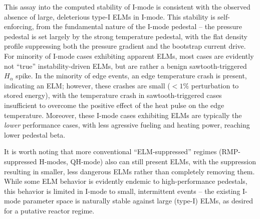 This assay into the computed stability of I-mode is consistent with the observed absence of large, deleterious type-I ELMs in I-mode.  This stability is self-enforcing, from the fundamental nature of the I-mode pedestal -- the pressure pedestal is set largely by the strong temperature pedestal, with the flat density profile suppressing both the pressure gradient and the bootstrap current drive.  For minority of I-mode cases exhibiting apparent ELMs, most cases are evidently not ``true'' instability-driven ELMs, but are rather a benign sawtooth-triggered $H_\alpha$ spike.  In the minority of edge events, an edge temperature crash is present, indicating an ELM; however, these crashes are small ($<1\%$ perturbation to stored energy), with the temperature crash in sawtooth-triggered cases insufficient to overcome the positive effect of the heat pulse on the edge temperature.  Moreover, these I-mode cases exhibiting ELMs are typically the \emph{lower} performance cases, with less agressive fueling and heating power, reaching lower pedestal beta.

It is worth noting that more conventional ``ELM-suppressed'' regimes (\eg RMP-suppressed H-modes, QH-mode) also can still present ELMs, with the suppression resulting in smaller, less dangerous ELMs rather than completely removing them.  While some ELM behavior is evidently endemic to high-performance pedestals, this behavior is limited in I-mode to small, intermittent events -- the existing I-mode parameter space is naturally stable against large (type-I) ELMs, as desired for a putative reactor regime.\nicechapterending


